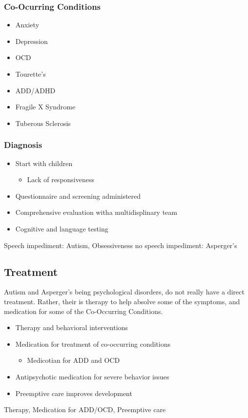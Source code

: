 \documentclass[journal]{IEEEtran}
\begin{document}
\subsubsection{Co-Ocurring Conditions}
\begin{itemize}
\item Anxiety
\item Depression
\item OCD
\item Tourette's
\item ADD/ADHD
\item Fragile X Syndrome
\item Tuberous Sclerosis
\end{itemize}
\subsubsection{Diagnosis}
\begin{itemize}
\item Start with children
\begin{itemize}
\item Lack of responsiveness
\end{itemize}
\item Questionnaire and screening administered
\item Comprehensive evaluation witha  multidisplinary team
\item Cognitive and language testing
\end{itemize}
\begin{IEEEkeywords}
Speech impediment: Autism, Obsessiveness no speech impediment: Asperger's
\end{IEEEkeywords}
\subsection{Treatment}
Autism and Asperger's being psychological disorders, do not really have a direct treatment. Rather, their is therapy to help absolve some of the symptoms, and medication for some of the Co-Occurring Conditions.
\begin{itemize}
\item Therapy and behavioral interventions
\item Medication for treatment of co-occurring conditions
\begin{itemize}
\item Medicotian for ADD and OCD
\end{itemize}
\item Antipsychotic medication for severe behavior issues
\item Preemptive care improves development
\end{itemize}
\begin{IEEEkeywords}
Therapy, Medication for ADD/OCD, Preemptive care
\end{IEEEkeywords}
\end{document}
